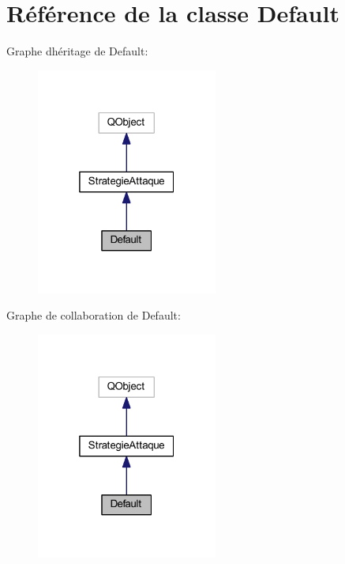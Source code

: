 \hypertarget{class_default}{}\section{Référence de la classe Default}
\label{class_default}


Graphe d\textquotesingle{}héritage de Default\+:
\nopagebreak
\begin{figure}[H]
\begin{center}
\leavevmode
\includegraphics[width=169pt]{class_default__inherit__graph}
\end{center}
\end{figure}


Graphe de collaboration de Default\+:
\nopagebreak
\begin{figure}[H]
\begin{center}
\leavevmode
\includegraphics[width=169pt]{class_default__coll__graph}
\end{center}
\end{figure}

